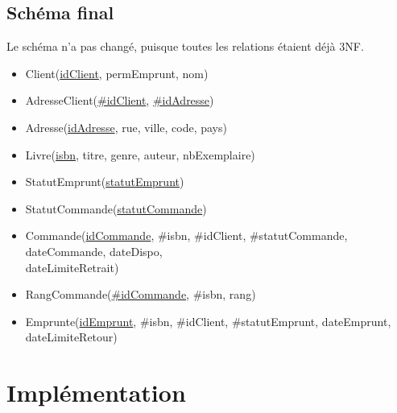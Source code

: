 \documentclass{article}
\begin{document}
\subsection{Schéma final}
Le schéma n'a pas changé, puisque toutes les relations étaient déjà 3NF.
\begin{itemize}[label=$\bullet$]
\item Client(\underline{idClient}, permEmprunt, nom)
\item AdresseClient(\underline{\#idClient}, \underline{\#idAdresse})
\item Adresse(\underline{idAdresse}, rue, ville, code, pays)
\item Livre(\underline{isbn}, titre, genre, auteur, nbExemplaire)
\item StatutEmprunt(\underline{statutEmprunt})
\item StatutCommande(\underline{statutCommande})
\item Commande(\underline{idCommande}, \#isbn, \#idClient, \#statutCommande,
  dateCommande, dateDispo, \\
  dateLimiteRetrait)
\item RangCommande(\underline{\#idCommande}, \#isbn, rang)
\item Emprunte(\underline{idEmprunt}, \#isbn, \#idClient, \#statutEmprunt,
  dateEmprunt, dateLimiteRetour)
\end{itemize}

\section{Implémentation}
\end{document}
